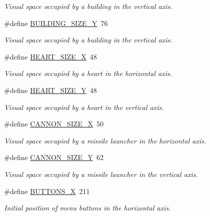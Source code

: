 \begin{DoxyCompactItemize}
\begin{DoxyCompactList}\small\item\em Visual space occupied by a building in the vertical axis. \end{DoxyCompactList}\item 
\#define \hyperlink{group___b_m_ps_holder_ga40c389b30cd50f3fa1dbcb7a6b3546b4}{B\+U\+I\+L\+D\+I\+N\+G\+\_\+\+S\+I\+Z\+E\+\_\+Y}~76
\begin{DoxyCompactList}\small\item\em Visual space occupied by a building in the vertical axis. \end{DoxyCompactList}\item 
\#define \hyperlink{group___b_m_ps_holder_gae4bece6dba12dec287829c15c2f112a1}{H\+E\+A\+R\+T\+\_\+\+S\+I\+Z\+E\+\_\+X}~48
\begin{DoxyCompactList}\small\item\em Visual space occupied by a heart in the horizontal axis. \end{DoxyCompactList}\item 
\#define \hyperlink{group___b_m_ps_holder_ga4353bbd4b002c88bdd587991a9a3a2ce}{H\+E\+A\+R\+T\+\_\+\+S\+I\+Z\+E\+\_\+Y}~48
\begin{DoxyCompactList}\small\item\em Visual space occupied by a heart in the vertical axis. \end{DoxyCompactList}\item 
\#define \hyperlink{group___b_m_ps_holder_gac6a06e6bc22a5b60c419594300c1749f}{C\+A\+N\+N\+O\+N\+\_\+\+S\+I\+Z\+E\+\_\+X}~50
\begin{DoxyCompactList}\small\item\em Visual space occupied by a missile launcher in the horizontal axis. \end{DoxyCompactList}\item 
\#define \hyperlink{group___b_m_ps_holder_gad3b9eb80fe60bc8f7530633439fa9b25}{C\+A\+N\+N\+O\+N\+\_\+\+S\+I\+Z\+E\+\_\+Y}~62
\begin{DoxyCompactList}\small\item\em Visual space occupied by a missile launcher in the vertical axis. \end{DoxyCompactList}\item 
\#define \hyperlink{group___b_m_ps_holder_ga3d387db7d44e83471b3a63d94ab7a5b9}{B\+U\+T\+T\+O\+N\+S\+\_\+X}~211
\begin{DoxyCompactList}\small\item\em Initial position of menu buttons in the horizontal axis. \end{DoxyCompactList}\item 

\end{DoxyCompactItemize}

